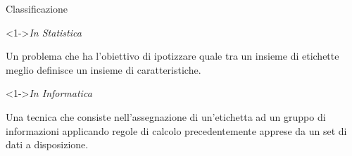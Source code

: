 \begin{tframe}{Classificazione}

    \begin{block}<1->{\textit{In Statistica}}
        
        
        Un problema che ha l'obiettivo di ipotizzare 
        quale tra un insieme di etichette meglio definisce un insieme di caratteristiche.
        
        
    \end{block}

    \begin{block}<1->{\textit{In Informatica}}
        
        Una tecnica che consiste nell'assegnazione di un'etichetta ad un gruppo di informazioni applicando
        regole di calcolo precedentemente apprese da un set di dati a disposizione.

    \end{block}

        


\end{tframe}